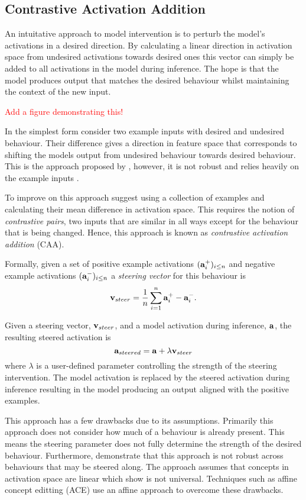 \subsection{Contrastive Activation Addition}
\label{caa}

An intuitative approach to model intervention is to perturb the model's activations in a desired direction.
By calculating a linear direction in activation space from undesired activations towards desired ones this vector can simply be added to all activations in the model during inference.
The hope is that the model produces output that matches the desired behaviour whilst maintaining the context of the new input.

\textcolor{red}{Add a figure demonstrating this!}

In the simplest form consider two example inputs with desired and undesired behaviour.
Their difference gives a direction in feature space that corresponds to shifting the models output from undesired behaviour towards desired behaviour.
This is the approach proposed by \citet{activation-addition}, however, it is not robust and relies heavily on the example inputs \cite{caa}.

To improve on this approach \citet{caa} suggest using a collection of examples and calculating their mean difference in activation space.
This requires the notion of \textit{contrastive pairs}, two inputs that are similar in all ways except for the behaviour that is being changed.
Hence, this approach is known as \textit{contrastive activation addition} (CAA).

Formally, given a set of positive example activations $(\mathbf{a}_i^+)_{i\le n}$ and negative example activations $(\mathbf{a}_i^-)_{i\le n}$ a \textit{steering vector} for this behaviour is
\[\mathbf{v}_{steer} = \frac{1}{n}\sum_{i=1}^{n}\mathbf{a}_i^+ - \mathbf{a}_i^-.\]

Given a steering vector, $\mathbf{v}_{steer}$, and a model activation during inference, $\mathbf{a}$, the resulting steered activation is
\begin{equation}
    \label{eq:caa}
    \mathbf{a}_{steered} = \mathbf{a} + \lambda\mathbf{v}_{steer}
\end{equation}
where $\lambda$ is a user-defined parameter controlling the strength of the steering intervention.
The model activation is replaced by the steered activation during inference resulting in the model producing an output aligned with the positive examples.

This approach has a few drawbacks \cite{steerability, ace, non-linear-features} due to its assumptions.
Primarily this approach does not consider how much of a behaviour is already present.
This means the steering parameter does not fully determine the strength of the desired behaviour.
Furthermore, \citet{steerability} demonstrate that this approach is not robust across behaviours that may be steered along.
The approach assumes that concepts in activation space are linear which \citet{non-linear-features} show is not universal.
Techniques such as affine concept editting (ACE)  use an affine approach to overcome these drawbacks.

